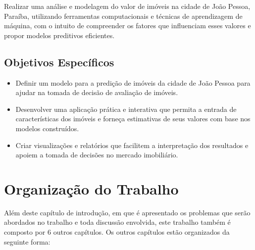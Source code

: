\documentclass[
  12pt,
  a4paper,
]{scrreprt}
\begin{document}
Realizar uma análise e modelagem do valor de imóveis na cidade de João
Pessoa, Paraíba, utilizando ferramentas computacionais e técnicas de
aprendizagem de máquina, com o intuito de compreender os fatores que
influenciam esses valores e propor modelos preditivos eficientes.

\subsection{Objetivos Específicos}\label{objetivos-especuxedficos}

\begin{itemize}
\item
  Definir um modelo para a predição de imóveis da cidade de João Pessoa
  para ajudar na tomada de decisão de avaliação de imóveis.
\item
  Desenvolver uma aplicação prática e interativa que permita a entrada
  de características dos imóveis e forneça estimativas de seus valores
  com base nos modelos construídos.
\item
  Criar visualizações e relatórios que facilitem a interpretação dos
  resultados e apoiem a tomada de decisões no mercado imobiliário.
\end{itemize}

\section{Organização do Trabalho}\label{organizauxe7uxe3o-do-trabalho}

Além deste capítulo de introdução, em que é apresentado os problemas que
serão abordados no trabalho e toda discussão envolvida, este trabalho
também é composto por 6 outros capítulos. Os outros capítulos estão
organizados da seguinte forma:
\end{document}
